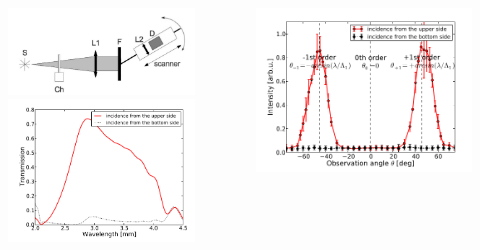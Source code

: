 \documentclass{beamer}
\begin{document}
\begin{frame}
	\begin{columns}
		\begin{column}{0.5\textwidth}
			\begin{figure}
				\includegraphics[width=\textwidth]{../images/dmg/letters_exp_setup.png}\\
				\includegraphics[width=\textwidth]{../images/dmg/letters_spect.png}\\
			\end{figure}
		\end{column}
		\begin{column}{0.5\textwidth}
				\includegraphics[width=\textwidth]{../images/dmg/letters_exp.png}\\

\end{column}
\end{columns}
\end{frame}
\end{document}
